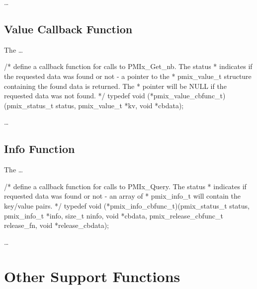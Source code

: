 \descr

\ldots




\subsection{Value Callback Function}

The  \ldots

\cspecificstart
\begin{codepar}
/* define a callback function for calls to PMIx_Get_nb. The status
 * indicates if the requested data was found or not - a pointer to the
 * pmix_value_t structure containing the found data is returned. The
 * pointer will be NULL if the requested data was not found. */
typedef void (*pmix_value_cbfunc_t)(pmix_status_t status,
                                    pmix_value_t *kv, void *cbdata);
\end{codepar}
\cspecificend

\descr

\ldots


\subsection{Info Function}

The  \ldots

\cspecificstart
\begin{codepar}
/* define a callback function for calls to PMIx_Query. The status
 * indicates if requested data was found or not - an array of
 * pmix_info_t will contain the key/value pairs. */
typedef void (*pmix_info_cbfunc_t)(pmix_status_t status,
                                   pmix_info_t *info, size_t ninfo,
                                   void *cbdata,
                                   pmix_release_cbfunc_t release_fn,
                                   void *release_cbdata);
\end{codepar}
\cspecificend

\descr

\ldots





\section{Other Support Functions}

